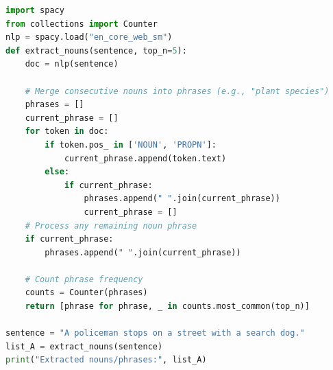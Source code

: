 \documentclass[11pt,letterpaper]{article}
\begin{document}
\begin{lstlisting}[language=Python, caption={Code for Noun extraction}, label={lst:mask_processing}]
import spacy
from collections import Counter
nlp = spacy.load("en_core_web_sm")
def extract_nouns(sentence, top_n=5):
    doc = nlp(sentence)

    # Merge consecutive nouns into phrases (e.g., "plant species")
    phrases = []
    current_phrase = []
    for token in doc:
        if token.pos_ in ['NOUN', 'PROPN']:
            current_phrase.append(token.text)
        else:
            if current_phrase:
                phrases.append(" ".join(current_phrase))
                current_phrase = []
    # Process any remaining noun phrase
    if current_phrase:
        phrases.append(" ".join(current_phrase))

    # Count phrase frequency
    counts = Counter(phrases)
    return [phrase for phrase, _ in counts.most_common(top_n)]

sentence = "A policeman stops on a street with a search dog."
list_A = extract_nouns(sentence)
print("Extracted nouns/phrases:", list_A)
\end{lstlisting}
\end{document}
